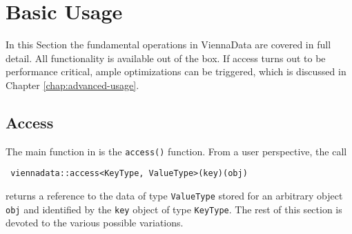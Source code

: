 \chapter{Basic Usage} \label{chap:basic-usage}

In this Section the fundamental operations in ViennaData are covered in full detail. 
All functionality is available out of the box. If {\ViennaData} access turns out to be 
performance critical, ample optimizations can be triggered, which is discussed in Chapter \ref{chap:advanced-usage}.

\section{Access}
The main function in {\ViennaData} is the \lstinline|access()| function. From a user perspective,
the call
\begin{lstlisting}
 viennadata::access<KeyType, ValueType>(key)(obj) 
\end{lstlisting}
returns a reference to the data of type \lstinline|ValueType| stored for an arbitrary object \lstinline|obj| and identified by the \lstinline|key| object of
type \lstinline|KeyType|. The rest of this section is devoted to the various possible variations.


